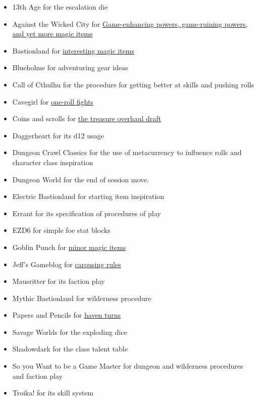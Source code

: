 \documentclass{article}
\begin{document}
\begin{itemize}
    \item 13th Age for the escalation die
    \item Against the Wicked City for \href{https://udan-adan.blogspot.com/2021/10/game-enhancing-powers-game-ruining.html?utm_source=substack&utm_medium=email}{Game-enhancing powers, game-ruining powers, and yet more magic items}
    \item Bastionland for \href{https://www.bastionland.com/2009/07/100-interesting-magic-items-first-half.html}{interesting magic items}
    \item Blueholme for adventuring gear ideas
    \item Call of Cthulhu for the procedure for getting better at skills and pushing rolls
    \item Cavegirl for \href{https://cavegirlgames.blogspot.com/2018/03/one-roll-fights.html}{one-roll fights}
    \item Coins and scrolls for \href{https://coinsandscrolls.blogspot.com/2024/01/osr-treasure-overhaul.html}{the treasure overhaul draft}
    \item Daggerheart for its d12 usage
    \item Dungeon Crawl Classics for the use of metacurrency to influence rolls and character 
          class inspiration
    \item Dungeon World for the end of session move.
    \item Electric Bastionland for starting item inspiration 
    \item Errant for its specification of procedures of play
    \item EZD6 for simple foe stat blocks
    \item Goblin Punch for \href{https://goblinpunch.blogspot.com/2015/01/d100-minor-magical-items.html}{minor magic items}
    \item Jeff's Gameblog for \href{https://jrients.blogspot.com/2008/12/party-like-its-999.html}{carousing rules}
    \item Mausritter for its faction play
    \item Mythic Bastionland for wilderness procedure
    \item Papers and Pencils for \href{https://www.paperspencils.com/the-haven-turn/}{haven turns}
    \item Savage Worlds for the exploding dice
    \item Shadowdark for the class talent table
    \item So you Want to be a Game Master for dungeon and wilderness procedures and faction play
    \item Troika! for its skill system
\end{itemize}
\end{document}
